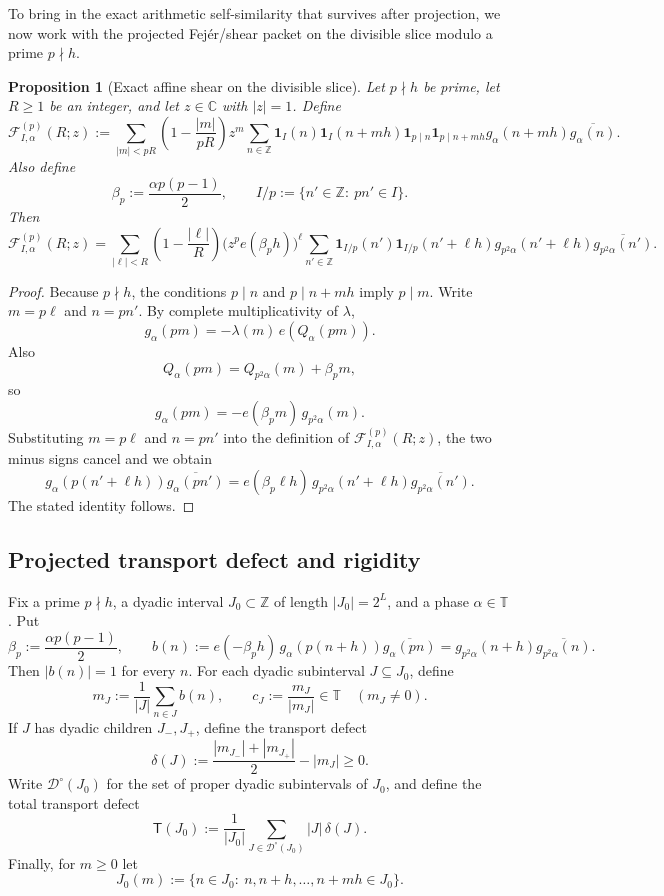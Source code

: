 \documentclass[11pt]{scrartcl}
\numberwithin{equation}{section}
\newtheorem{proposition}[theorem]{Proposition}
\theoremstyle{definition}
\newcommand{\Z}{\mathbb Z}
\newcommand{\C}{\mathbb C}
\newcommand{\T}{\mathbb T}
\newcommand{\1}{\mathbf 1}
\newcommand{\ee}[1]{e\!\left(#1\right)}
\begin{document}
To bring in the exact arithmetic self-similarity that survives after projection, we now work with the projected Fej\'er/shear packet on the divisible slice modulo a prime $p\nmid h$.

\begin{proposition}[Exact affine shear on the divisible slice]
\label{prop:projected-affine-shear}
Let $p\nmid h$ be prime, let $R\ge 1$ be an integer, and let $z\in\C$ with $|z|=1$. Define
\[
\mathcal F^{(p)}_{I,\alpha}(R;z)
:=
\sum_{|m|<pR}\left(1-\frac{|m|}{pR}\right)z^m
\sum_{n\in\Z}
\mathbf 1_I(n)\mathbf 1_I(n+mh)
\mathbf 1_{p\mid n}\mathbf 1_{p\mid n+mh}
 g_\alpha(n+mh)\overline{g_\alpha(n)}.
\]
Also define
\[
\beta_p:=\frac{\alpha p(p-1)}{2},
\qquad
I/p:=\{n'\in\Z:\ pn'\in I\}.
\]
Then
\[
\mathcal F^{(p)}_{I,\alpha}(R;z)
=
\sum_{|\ell|<R}\left(1-\frac{|\ell|}{R}\right)
\bigl(z^p\ee{\beta_ph}\bigr)^\ell
\sum_{n'\in\Z}
\mathbf 1_{I/p}(n')\mathbf 1_{I/p}(n'+\ell h)
 g_{p^2\alpha}(n'+\ell h)\overline{g_{p^2\alpha}(n')}.
\]
\end{proposition}

\begin{proof}
Because $p\nmid h$, the conditions $p\mid n$ and $p\mid n+mh$ imply $p\mid m$. Write $m=p\ell$ and $n=pn'$. By complete multiplicativity of $\lambda$,
\[
g_\alpha(pm)
=
-\lambda(m)\,\ee{Q_\alpha(pm)}.
\]
Also
\[
Q_\alpha(pm)=Q_{p^2\alpha}(m)+\beta_p m,
\]
so
\[
g_\alpha(pm)=-\ee{\beta_p m}\,g_{p^2\alpha}(m).
\]
Substituting $m=p\ell$ and $n=pn'$ into the definition of $\mathcal F^{(p)}_{I,\alpha}(R;z)$, the two minus signs cancel and we obtain
\[
g_\alpha(p(n'+\ell h))\overline{g_\alpha(pn')}
=
\ee{\beta_p\ell h}\,g_{p^2\alpha}(n'+\ell h)\overline{g_{p^2\alpha}(n')}.
\]
The stated identity follows.
\end{proof}


\subsection{Projected transport defect and rigidity}

Fix a prime $p\nmid h$, a dyadic interval $J_0\subset\Z$ of length $|J_0|=2^L$, and a phase $\alpha\in\T$. Put
\[
\beta_p:=\frac{\alpha p(p-1)}{2},
\qquad
b(n):=\ee{-\beta_ph}\,g_\alpha(p(n+h))\overline{g_\alpha(pn)}
= g_{p^2\alpha}(n+h)\overline{g_{p^2\alpha}(n)}.
\]
Then $|b(n)|=1$ for every $n$. For each dyadic subinterval $J\subseteq J_0$, define
\[
m_J:=\frac1{|J|}\sum_{n\in J} b(n),
\qquad
c_J:=\frac{m_J}{|m_J|}\in\T
\quad (m_J\neq 0).
\]
If $J$ has dyadic children $J_-,J_+$, define the transport defect
\[
\delta(J):=\frac{|m_{J_-}|+|m_{J_+}|}{2}-|m_J|\ge 0.
\]
Write $\mathcal D^\circ(J_0)$ for the set of proper dyadic subintervals of $J_0$, and define the total transport defect
\[
\mathsf T(J_0):=\frac1{|J_0|}\sum_{J\in\mathcal D^\circ(J_0)} |J|\,\delta(J).
\]
Finally, for $m\ge 0$ let
\[
J_0(m):=\{n\in J_0:\ n,n+h,\dots,n+mh\in J_0\}.
\]
\end{document}
